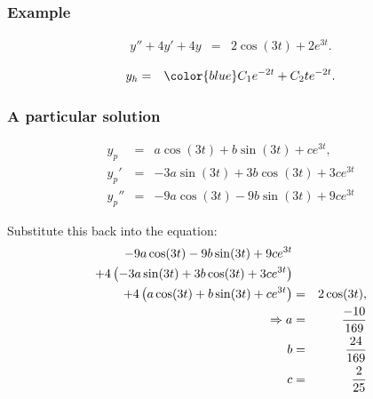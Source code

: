 \begin{frame}
  \frametitle{Example}

  \begin{eqnarray*}
    y'' + 4y' + 4y & = & 2 \cos(3t) + 2e^{3t}.
  \end{eqnarray*}

  {
    \begin{eqnarray*}
      y_h & = & {\color{blue}C_1 e^{-2t} + C_2 t e^{-2t}}.
    \end{eqnarray*}
  }

\end{frame}


\begin{frame}
  \frametitle{A particular solution}

  \begin{eqnarray*}
    y_p & = & a \cos(3t) + b \sin(3t) + ce^{3t}, \\
    y_p' & = & -3 a \sin(3t) + 3b \cos(3t) + 3 c e^{3t}\\
    y_p'' & = & -9 a \cos(3t) - 9b \sin(3t) + 9 c e^{3t}
  \end{eqnarray*}

  Substitute this back into the equation:
  \begin{eqnarray*}
    -9 a \cos(3t) - 9b \sin(3t) + 9 c e^{3t} & & \\
    + 4 \left( -3 a \sin(3t) + 3b \cos(3t) + 3c e^{3t}\right)  & & \\
    + 4 \left( a \cos(3t) + b \sin(3t) + c e^{3t}\right)
     & = & 2 \cos(3t), \\
    \Rightarrow 
    a & = & \frac{-10}{169} \\
    b & = & \frac{24}{169} \\
    c & = & \frac{2}{25} 
  \end{eqnarray*}


\end{frame}


